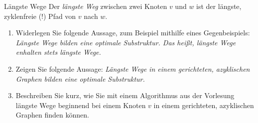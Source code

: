 \documentclass[11pt,a4paper]{article}
\begin{document}
\begin{aufgabe}{4}{Längste Wege}
    Der \emph{längste Weg} zwischen zwei Knoten $v$ und $w$ ist der längste, zyklenfreie (!) Pfad von $v$ nach $w$.
    \begin{enumerate}
        \item Widerlegen Sie folgende Aussage, zum Beispiel mithilfe eines Gegenbeispiels:
        \emph{Längste Wege bilden eine optimale Substruktur. Das heißt, längste Wege enhalten stets längste Wege.}
        \item Zeigen Sie folgende Aussage:
        \emph{Längste Wege in einem gerichteten, azyklischen Graphen bilden eine optimale Substruktur.}
        \item Beschreiben Sie kurz, wie Sie mit einem Algorithmus aus der Vorlesung längste Wege beginnend bei einem Knoten $v$ in einem gerichteten, azyklischen Graphen finden können.
    \end{enumerate}
\end{aufgabe}
\end{document}
